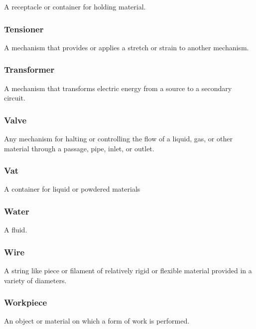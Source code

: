 A receptacle or container for holding material.

\FloatBarrier

\subsubsection{Tensioner}
\label{sec:Tensioner}



A mechanism that provides or applies a stretch or strain to another mechanism.

\FloatBarrier

\subsubsection{Transformer}
\label{sec:Transformer}



A mechanism that transforms electric energy from a source to a secondary circuit.

\FloatBarrier

\subsubsection{Valve}
\label{sec:Valve}



Any mechanism for halting or controlling the flow of a liquid, gas, or other material through a passage, pipe, inlet, or outlet.

\FloatBarrier

\subsubsection{Vat}
\label{sec:Vat}



A container for liquid or powdered materials

\FloatBarrier

\subsubsection{Water}
\label{sec:Water}



A fluid.

\FloatBarrier

\subsubsection{Wire}
\label{sec:Wire}



A string like piece or filament of relatively rigid or flexible material provided in a variety of diameters.

\FloatBarrier

\subsubsection{Workpiece}
\label{sec:Workpiece}



An object or material on which a form of work is performed.

\FloatBarrier
